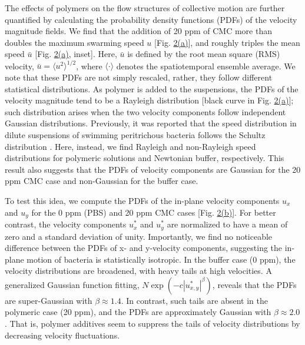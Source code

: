 \documentclass[aps,prl,floatfix,footinbib,twocolumn,superscriptaddress]{revtex4-1}
\begin{document}
The effects of polymers on the flow structures of collective motion are further quantified by calculating the probability density functions (PDFs) of the velocity magnitude fields. We find that the addition of 20 ppm of CMC more than doubles the maximum swarming speed $u$ [Fig. \hyperref[fig2]{2(a)}], and roughly triples the mean speed $\bar{u}$ [Fig. \hyperref[fig2]{2(a)}, inset]. Here, $\bar{u}$ is defined by the root mean square (RMS) velocity, $\bar{u}=\langle u^2\rangle^{1/2}$, where $\langle\cdot\rangle$ denotes the spatiotemporal ensemble average. We note that these PDFs are not simply rescaled, rather, they follow different statistical distributions. As polymer is added to the suspensions, the PDFs of the velocity magnitude tend to be a Rayleigh distribution [black curve in Fig. \hyperref[fig2]{2(a)}]; such distribution arises when the two velocity components follow independent Gaussian distributions. Previously, it was reported that the speed distribution in dilute suspensions of swimming peritrichous bacteria follows the Schultz distribution \cite{Wilson_PRL_2011}. Here, instead, we find Rayleigh and non-Rayleigh speed distributions for polymeric solutions and Newtonian buffer, respectively. This result also suggests that the PDFs of velocity components are Gaussian for the 20 ppm CMC case and non-Gaussian for the buffer case.


To test this idea, we compute the PDFs of the in-plane velocity components $u_x$ and $u_y$ for the 0 ppm (PBS) and 20 ppm CMC cases [Fig. \hyperref[fig2]{2(b)}]. For better contrast, the velocity components $u_x^*$ and $u_y^*$ are normalized to have a mean of zero and a standard deviation of unity. Importantly, we find no noticeable difference between the PDFs of x- and y-velocity components, suggesting the in-plane motion of bacteria is statistically isotropic. In the buffer case (0 ppm), the velocity distributions are broadened, with heavy tails at high velocities. A generalized Gaussian function fitting, $N\exp(-c|u_{x,y}^*|^{\beta})$, reveals that the PDFs are super-Gaussian with $\beta\approx1.4$. In contrast, such tails are absent in the polymeric case (20 ppm), and the PDFs are approximately Gaussian with $\beta\approx2.0$. That is, polymer additives seem to suppress the tails of velocity distributions by decreasing velocity fluctuations.
\end{document}
